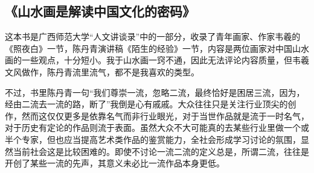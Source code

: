 \subsection{《山水画是解读中国文化的密码》}

这本书是广西师范大学“人文讲谈录”中的一部分，收录了青年画家、作家韦羲的《照夜白》一节，陈丹青演讲稿《陌生的经验》一节，内容是两位画家对中国山水画的一些观点，十分短小。我于山水画一窍不通，因此无法评论内容质量，但韦羲文风做作，陈丹青流里流气，都不是我喜欢的类型。

不过，书里陈丹青一句“我们尊崇一流，忽略二流，最终恰好是困居三流，因为，经由二流去一流的路，断了”我倒是心有戚戚。大众往往只是关注行业顶尖的创作，然而这仅仅更多是依靠名气而非行业眼光，对于当世作品就是流于一时名气，对于历史有定论的作品则流于表面。虽然大众不大可能真的去某些行业里做一个或半个专家，但也应当提高艺术类作品的鉴赏能力，全社会形成学习讨论的氛围，显然当前社会这是比较困难的。即使不讨论一流二流的定义总是，所谓二流，往往是开创了某些一流的先声，其意义未必比一流作品本身更低。